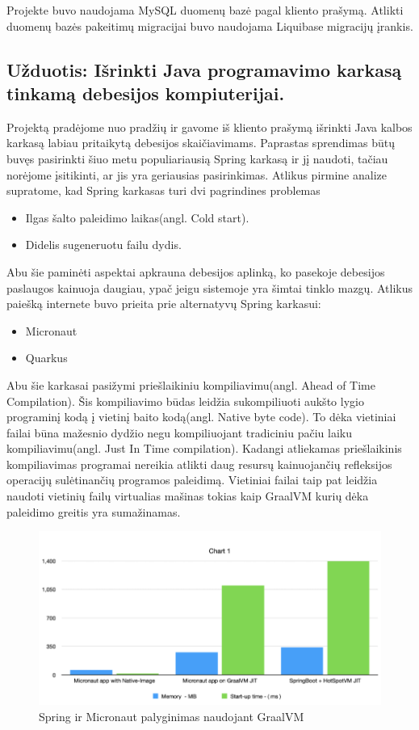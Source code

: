 \documentclass{VUMIFPSkursinis}
\begin{document}
		Projekte buvo naudojama MySQL duomenų bazė pagal kliento prašymą.
		Atlikti duomenų bazės pakeitimų migracijai buvo naudojama Liquibase migracijų įrankis.

	\subsection{Užduotis: Išrinkti Java programavimo karkasą tinkamą debesijos kompiuterijai.}
		Projektą pradėjome nuo pradžių ir gavome iš kliento prašymą išrinkti Java kalbos karkasą labiau pritaikytą debesijos skaičiavimams.
		Paprastas sprendimas būtų buvęs pasirinkti šiuo metu populiariausią Spring karkasą ir jį naudoti, tačiau norėjome įsitikinti, ar jis yra geriausias pasirinkimas.
		Atlikus pirmine analize supratome, kad Spring karkasas turi dvi pagrindines problemas
		\begin{itemize}
			\item{Ilgas šalto paleidimo laikas(angl. Cold start).}
			\item{Didelis sugeneruotu failu dydis.}
		\end{itemize}
		Abu šie paminėti aspektai apkrauna debesijos aplinką, ko pasekoje debesijos paslaugos kainuoja daugiau, ypač jeigu sistemoje yra šimtai tinklo mazgų.
		Atlikus paiešką internete buvo prieita prie alternatyvų Spring karkasui:
		\begin{itemize}
			\item{Micronaut}
			\item{Quarkus}
		\end{itemize}
		Abu šie karkasai pasižymi priešlaikiniu kompiliavimu(angl. Ahead of Time Compilation).
		Šis kompiliavimo būdas leidžia sukompiliuoti aukšto lygio programinį kodą į vietinį baito kodą(angl. Native byte code).
		To dėka vietiniai failai būna mažesnio dydžio negu kompiliuojant tradiciniu pačiu laiku kompiliavimu(angl. Just In Time compilation).
		Kadangi atliekamas priešlaikinis kompiliavimas programai nereikia atlikti daug resursų kainuojančių refleksijos operacijų sulėtinančių programos paleidimą.
		Vietiniai failai taip pat leidžia naudoti vietinių failų virtualias mašinas tokias kaip GraalVM kurių dėka paleidimo greitis yra sumažinamas.
			\begin{figure}[H]
			\includegraphics[scale=0.7]{img/three}
			\caption{Spring ir Micronaut palyginimas naudojant GraalVM} %
			\label{img:kurimoProcesas}
			\end{figure}
\end{document}
